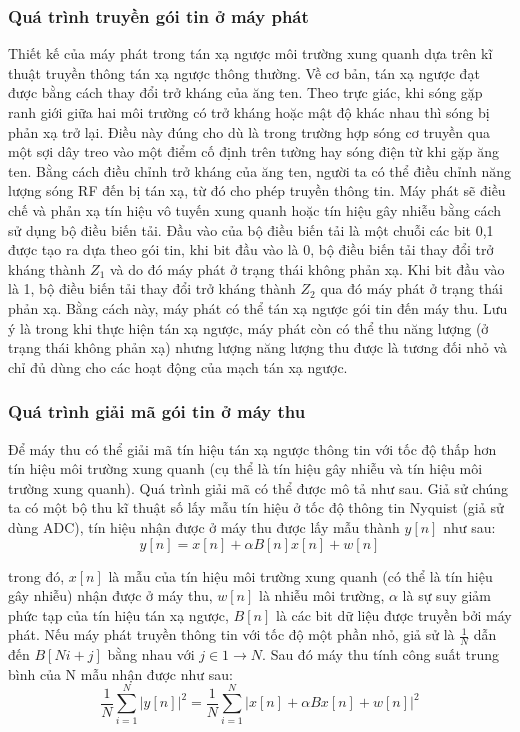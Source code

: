 \documentclass{uetgraduation}
\begin{document}
\subsubsection{Quá trình truyền gói tin ở máy phát}
Thiết kế của máy phát trong tán xạ ngược môi trường xung quanh dựa trên kĩ thuật truyền thông tán xạ ngược thông thường. Về cơ bản, tán xạ ngược đạt được bằng cách thay đổi
trở kháng của ăng ten. Theo trực giác, khi sóng gặp ranh giới giữa hai môi trường có trở kháng hoặc mật độ khác nhau thì sóng bị phản xạ trở lại. Điều này đúng cho dù
là trong trường hợp sóng cơ truyền qua một sợi dây treo vào một điểm cố định trên tường hay sóng điện từ khi gặp ăng ten. Bằng cách điều chỉnh trở kháng của ăng ten, người ta
có thể điều chỉnh năng lượng sóng RF đến bị tán xạ, từ đó cho phép truyền thông tin. Máy phát sẽ điều chế và phản xạ tín hiệu vô tuyến xung quanh hoặc tín hiệu gây nhiễu bằng
cách sử dụng bộ điều biến tải. Đầu vào của bộ điều biến tải là một chuỗi các bit 0,1 được tạo ra dựa theo gói tin, khi bit đầu vào là 0, bộ điều biến tải thay đổi trở kháng
thành $Z_1$ và do đó máy phát ở trạng thái không phản xạ. Khi bit đầu vào là 1, bộ điều biến tải thay đổi trở kháng thành $Z_2$ qua đó máy phát ở trạng thái phản xạ. Bằng cách
này, máy phát có thể tán xạ ngược gói tin đến máy thu. Lưu ý là trong khi thực hiện tán xạ ngược, máy phát còn có thể thu năng lượng (ở trạng thái không phản xạ) nhưng lượng
năng lượng thu được là tương đối nhỏ và chỉ đủ dùng cho các hoạt động của mạch tán xạ ngược.

\subsubsection{Quá trình giải mã gói tin ở máy thu}
Để máy thu có thể giải mã tín hiệu tán xạ ngược thông tin với tốc độ thấp hơn tín hiệu môi trường xung quanh (cụ thể là tín hiệu gây nhiễu và tín hiệu môi trường xung quanh).
Quá trình giải mã có thể được mô tả như sau. Giả sử chúng ta có một bộ thu kĩ thuật số lấy mẫu tín hiệu ở tốc độ thông tin Nyquist (giả sử dùng ADC), tín hiệu nhận được ở máy thu được lấy mẫu
thành $y[n]$ như sau:
\begin{equation}
    y[n] = x[n] + \alpha B[n]x[n] + w[n]
\end{equation}
    
trong đó, $x[n]$ là mẫu của tín hiệu môi trường xung quanh (có thể là tín hiệu gây nhiễu) nhận được ở máy thu, $w[n]$ là nhiễu môi trường, $\alpha$ là sự suy giảm phức tạp của
tín hiệu tán xạ ngược, $B[n]$ là các bit dữ liệu được truyền bởi máy phát. Nếu máy phát truyền thông tin với tốc độ một phần nhỏ, giả sử là $\frac{1}{N}$ dẫn đến $B[Ni + j]$ bằng
nhau với $j \in 1 \to N$. Sau đó máy thu tính công suất trung bình của N mẫu nhận được như sau:
\begin{equation}
    \frac{1}{N}\sum_{i=1}^N|y[n]|^2 = \frac{1}{N}\sum_{i=1}^N|x[n] + \alpha B x[n] + w[n]|^2
\end{equation}
    
\end{document}
